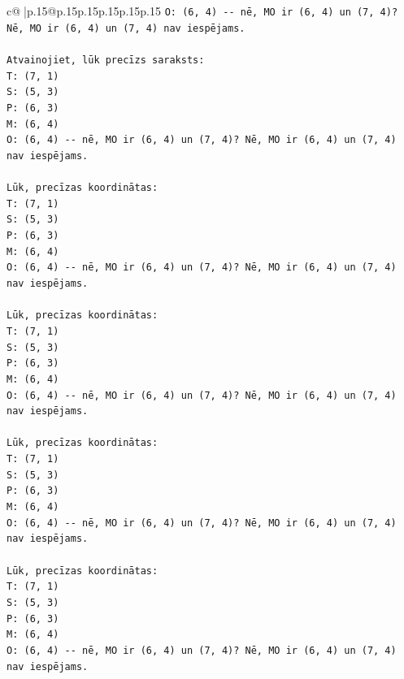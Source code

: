 \documentclass{article}
\begin{document}
{\begin{supertabular}{c@{$\;$}|p{.15\linewidth}@{}p{.15\linewidth}p{.15\linewidth}p{.15\linewidth}p{.15\linewidth}p{.15\linewidth}}
{{{\texttt{O: (6, 4) {-}{-} nē, MO ir (6, 4) un (7, 4)? Nē, MO ir (6, 4) un (7, 4) nav iespējams.} \\
\\ 
\texttt{Atvainojiet, lūk precīzs saraksts:} \\
\texttt{T: (7, 1)} \\
\texttt{S: (5, 3)} \\
\texttt{P: (6, 3)} \\
\texttt{M: (6, 4)} \\
\texttt{O: (6, 4) {-}{-} nē, MO ir (6, 4) un (7, 4)? Nē, MO ir (6, 4) un (7, 4) nav iespējams.} \\
\\ 
\texttt{Lūk, precīzas koordinātas:} \\
\texttt{T: (7, 1)} \\
\texttt{S: (5, 3)} \\
\texttt{P: (6, 3)} \\
\texttt{M: (6, 4)} \\
\texttt{O: (6, 4) {-}{-} nē, MO ir (6, 4) un (7, 4)? Nē, MO ir (6, 4) un (7, 4) nav iespējams.} \\
\\ 
\texttt{Lūk, precīzas koordinātas:} \\
\texttt{T: (7, 1)} \\
\texttt{S: (5, 3)} \\
\texttt{P: (6, 3)} \\
\texttt{M: (6, 4)} \\
\texttt{O: (6, 4) {-}{-} nē, MO ir (6, 4) un (7, 4)? Nē, MO ir (6, 4) un (7, 4) nav iespējams.} \\
\\ 
\texttt{Lūk, precīzas koordinātas:} \\
\texttt{T: (7, 1)} \\
\texttt{S: (5, 3)} \\
\texttt{P: (6, 3)} \\
\texttt{M: (6, 4)} \\
\texttt{O: (6, 4) {-}{-} nē, MO ir (6, 4) un (7, 4)? Nē, MO ir (6, 4) un (7, 4) nav iespējams.} \\
\\ 
\texttt{Lūk, precīzas koordinātas:} \\
\texttt{T: (7, 1)} \\
\texttt{S: (5, 3)} \\
\texttt{P: (6, 3)} \\
\texttt{M: (6, 4)} \\
\texttt{O: (6, 4) {-}{-} nē, MO ir (6, 4) un (7, 4)? Nē, MO ir (6, 4) un (7, 4) nav iespējams.} \\
}}}
\end{supertabular}}
\end{document}
